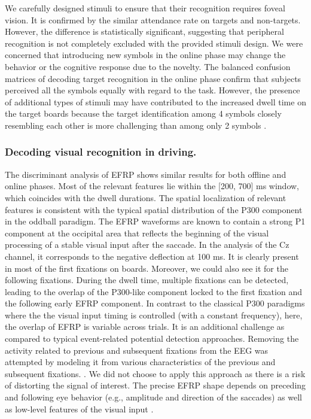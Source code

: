 \documentclass[12pt]{iopart}
\begin{document}
We carefully designed stimuli
to ensure that their recognition requires foveal vision.
It is confirmed by the similar
attendance rate on targets and non-targets.
However, the difference is statistically significant,
suggesting
that peripheral recognition is not completely excluded with the provided stimuli design.
We were concerned that introducing new symbols in the online phase
may change the behavior or the cognitive response due to the novelty.
The balanced confusion matrices of decoding target recognition in the online phase
confirm that subjects perceived all the symbols equally with regard
to the task. However, the presence of additional types of stimuli 
may have contributed to the increased dwell time 
on the target boards because the target identification 
among 4 symbols closely resembling each other 
is more challenging than among only 2 symbols
\cite{dick_processing_1971,alegria_time_1970}.


\subsubsection*{Decoding visual recognition in driving.}
The discriminant analysis of EFRP shows similar results for both
offline and online phases. Most of the relevant
features lie within the [200, 700] ms window, which coincides with the dwell
durations. The spatial localization of relevant features is consistent with the typical
spatial distribution of the P300 component in the oddball paradigm.
The EFRP waveforms are known to contain a strong P1 component at the occipital
area that reflects the beginning of the visual processing of a stable visual input
after the saccade. In the analysis of the Cz channel, it corresponds to the negative
deflection at 100 ms. It is clearly present in most of the first fixations on boards.
Moreover, we could also see it for the following fixations.
During the dwell time, multiple fixations can be detected, 
leading to the overlap of the P300-like component
locked to the first fixation and the following early EFRP component.
In contrast to the classical P300 paradigms where the 
the visual input timing
is controlled (with a constant frequency), here, the
overlap of EFRP is variable across trials.
It is an additional challenge as compared to typical
event-related potential detection approaches.
Removing the activity related to previous and subsequent fixations
from the EEG was attempted by modeling it from
various characteristics of the previous and subsequent fixations.
\cite{devillez_p300_2015,devillez_eye_2015,kristensen_comparison_2015}.
We did not choose to apply this approach as there is a risk 
of distorting the signal of interest.
The precise EFRP shape depends on preceding and following
eye behavior (e.g., amplitude and direction of the saccades)
as well as low-level features of the visual input
\cite{nikolaev_combining_2016}.
\end{document}
